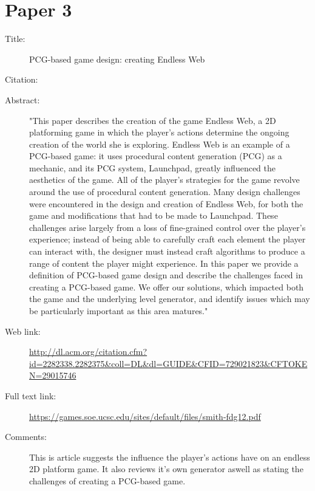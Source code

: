 \documentclass{scrartcl}
\begin{document}
\section*{Paper 3}
\begin{description}
\item[Title:] PCG-based game design: creating Endless Web
\item[Citation:] \cite{Smith:2012}
\item[Abstract:] "This paper describes the creation of the game Endless Web, a 2D platforming game in which the player's actions determine the ongoing creation of the world she is exploring. Endless Web is an example of a PCG-based game: it uses procedural content generation (PCG) as a mechanic, and its PCG system, Launchpad, greatly influenced the aesthetics of the game. All of the player's strategies for the game revolve around the use of procedural content generation. Many design challenges were encountered in the design and creation of Endless Web, for both the game and modifications that had to be made to Launchpad. These challenges arise largely from a loss of fine-grained control over the player's experience; instead of being able to carefully craft each element the player can interact with, the designer must instead craft algorithms to produce a range of content the player might experience. In this paper we provide a definition of PCG-based game design and describe the challenges faced in creating a PCG-based game. We offer our solutions, which impacted both the game and the underlying level generator, and identify issues which may be particularly important as this area matures."
\item[Web link:] \url{http://dl.acm.org/citation.cfm?id=2282338.2282375&coll=DL&dl=GUIDE&CFID=729021823&CFTOKEN=29015746}
\item[Full text link:] \url{https://games.soe.ucsc.edu/sites/default/files/smith-fdg12.pdf}
\item[Comments:] This is article suggests the influence the player's actions have on an endless 2D platform game. It also reviews it's own generator aswell as stating the challenges of creating a PCG-based game.
\end{description}
\end{document}
